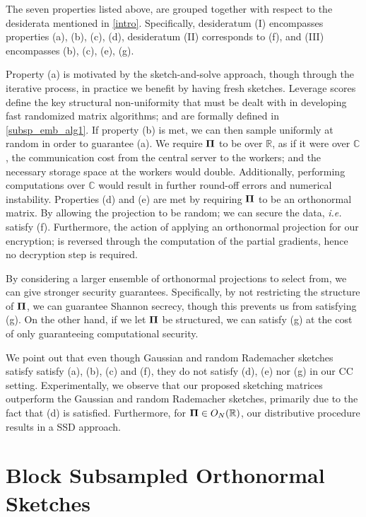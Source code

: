 \documentclass[journal,letterpaper,onecolumn,twoside,nofonttune]{IEEEtran}
\newcommand{\Pibold}{\bold{\Pi}}
\newcommand{\R}{\mathbb{R}}
\newcommand{\C}{\mathbb{C}}
\begin{document}
The seven properties listed above, are grouped together with respect to the desiderata mentioned in \ref{intro}. Specifically, desideratum (I) encompasses properties (a), (b), (c), (d), desideratum (II) corresponds to (f), and (III) encompasses (b), (c), (e), (g).

Property (a) is motivated by the sketch-and-solve approach, though through the iterative process, in practice we benefit by having fresh sketches. Leverage scores define the key structural non-uniformity that must be dealt with in developing fast randomized matrix algorithms; and are formally defined in \ref{subsp_emb_alg1}. If property (b) is met, we can then sample uniformly at random in order to guarantee (a). We require $\Pibold$ to be over $\R$, as if it were over $\C$, the communication cost from the central server to the workers; and the necessary storage space at the workers would double. Additionally, performing computations over $\C$ would result in further round-off errors and numerical instability. Properties (d) and (e) are met by requiring $\Pibold$ to be an orthonormal matrix. By allowing the projection to be random; we can secure the data, \textit{i.e.} satisfy (f). Furthermore, the action of applying an orthonormal projection for our encryption; is reversed through the computation of the partial gradients, hence no decryption step is required.

By considering a larger ensemble of orthonormal projections to select from, we can give stronger security guarantees. Specifically, by not restricting the structure of $\Pibold$, we can guarantee Shannon secrecy, though this prevents us from satisfying (g). On the other hand, if we let $\Pibold$ be structured, we can satisfy (g) at the cost of only guaranteeing computational security. 

We point out that even though Gaussian and random Rademacher sketches satisfy satisfy (a), (b), (c) and (f), they do not satisfy (d), (e) nor (g) in our CC setting. Experimentally, we observe that our proposed sketching matrices outperform the Gaussian and random Rademacher sketches, primarily due to the fact that (d) is satisfied. Furthermore, for $\Pibold\in O_N(\R)$, our distributive procedure results in a SSD approach.

\section{Block Subsampled Orthonormal Sketches}
\label{bl_orth_sk_sec}
\end{document}
